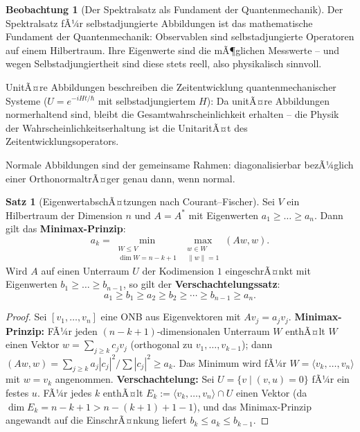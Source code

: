 ﻿\documentclass[a4paper,12pt]{report}
\theoremstyle{definition}
\newtheorem{satz}{Satz}
\newtheorem{beobachtung}{Beobachtung}
\begin{document}
\begin{beobachtung}[Der Spektralsatz als Fundament der Quantenmechanik]
    Der Spektralsatz fÃ¼r selbstadjungierte Abbildungen ist das mathematische
    Fundament der Quantenmechanik: Observablen sind selbstadjungierte
    Operatoren auf einem Hilbertraum. Ihre Eigenwerte sind die mÃ¶glichen
    Messwerte -- und wegen Selbstadjungiertheit sind diese stets reell,
    also physikalisch sinnvoll.

    UnitÃ¤re Abbildungen beschreiben die Zeitentwicklung quantenmechanischer
    Systeme ($U = e^{-iHt/\hbar}$ mit selbstadjungiertem $H$): Da
    unitÃ¤re Abbildungen normerhaltend sind, bleibt die
    Gesamtwahrscheinlichkeit erhalten -- die Physik der Wahrscheinlichkeitserhaltung
    ist die UnitaritÃ¤t des Zeitentwicklungsoperators.

    Normale Abbildungen sind der gemeinsame Rahmen: diagonalisierbar
    bezÃ¼glich einer OrthonormaltrÃ¤ger genau dann, wenn normal.
\end{beobachtung}

\begin{satz}[EigenwertabschÃ¤tzungen nach Courant--Fischer]
    Sei $V$ ein Hilbertraum der Dimension $n$ und $A = A^*$ mit
    Eigenwerten $a_1 \geq \dots \geq a_n$. Dann gilt das
    \textbf{Minimax-Prinzip}:
    \[
        a_k = \min_{\substack{W \leq V \\ \dim W = n-k+1}}
        \max_{\substack{w \in W \\ \|w\| = 1}} (Aw, w).
    \]
    Wird $A$ auf einen Unterraum $U$ der Kodimension $1$ eingeschrÃ¤nkt
    mit Eigenwerten $b_1 \geq \dots \geq b_{n-1}$, so gilt der
    \textbf{Verschachtelungssatz}:
    \[
        a_1 \geq b_1 \geq a_2 \geq b_2 \geq \cdots \geq b_{n-1} \geq a_n.
    \]
\end{satz}
\begin{proof}
    Sei $[v_1, \ldots, v_n]$ eine ONB aus Eigenvektoren mit $Av_j = a_j v_j$.
    \textbf{Minimax-Prinzip:} FÃ¼r jeden $(n-k+1)$-dimensionalen Unterraum $W$
    enthÃ¤lt $W$ einen Vektor $w = \sum_{j \geq k} c_j v_j$ (orthogonal zu
    $v_1, \ldots, v_{k-1}$); dann $(Aw, w) = \sum_{j \geq k} a_j |c_j|^2
    / \sum |c_j|^2 \geq a_k$. Das Minimum wird fÃ¼r $W = \langle v_k, \ldots, v_n \rangle$
    mit $w = v_k$ angenommen.
    \textbf{Verschachtelung:} Sei $U = \{v \mid (v, u) = 0\}$ fÃ¼r ein festes $u$.
    FÃ¼r jedes $k$ enthÃ¤lt $E_k := \langle v_k, \ldots, v_n \rangle \cap U$
    einen Vektor (da $\dim E_k = n-k+1 > n - (k+1) + 1 - 1$), und das
    Minimax-Prinzip angewandt auf die EinschrÃ¤nkung liefert $b_k \leq a_k \leq b_{k-1}$.
\end{proof}
\end{document}
